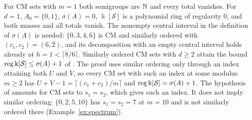 For CM sets with $m=1$ both semigroups are $\mathbb{N}$ and every total vanishes. For $d=1$, $A_0=\{0,1\}$, $\sigma(A)=0$, $\Bbbk[\mathcal S]$ is a polynomial ring of regularity $0$, and both masses and all totals vanish. The nonempty central interval in the definition of $\sigma(A)$ is needed: $\{0,3,4,6\}$ is CM and similarly ordered with $(c_1,c_2)=(6,2)$, and its decomposition with an empty central interval holds already at $h=1<\lceil8/6\rceil$. Similarly ordered CM sets with $d\ge2$ attain the bound $\operatorname{reg} \Bbbk[\mathcal S]\le\sigma(A)+1$ of \cite[Thm.~3.16]{GimenezGonzalezSanchez2023}. The proof uses similar ordering only through an index attaining both $U$ and $V$, so every CM set with such an index at some modulus $m\ge2$ has $U+V-1=\lceil(c_1+c_2)/m\rceil$ and $\operatorname{reg} \Bbbk[\mathcal S]=\sigma(A)+1$. The hypothesis of \cite[Prop.~3.18]{GimenezGonzalezSanchez2023} amounts for CM sets to $s_1=s_2$, which gives such an index. It does not imply similar ordering: $\{0,2,5,10\}$ has $s_1=s_2=7$ at $m=10$ and is not similarly ordered there (Example~\ref{ex:spectrum}).
